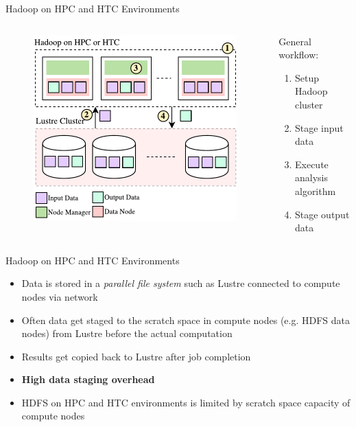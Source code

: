 \documentclass[newPxFont]{beamer}
\begin{document}
\begin{frame}[c]{Hadoop on HPC and HTC Environments}
\begin{columns}[T] %
\begin{column}{.48\textwidth}
\begin{figure}[t]
  \includegraphics[scale=0.5]{hadoop-on-hpc}
  \centering
\end{figure}
\end{column}%
\hfill%
\begin{column}{.48\textwidth}
General workflow:
\begin{enumerate}
  \item Setup Hadoop cluster
  \item Stage input data
  \item Execute analysis algorithm
  \item Stage output data
\end{enumerate}
\end{column}%
\end{columns}

\end{frame}

\begin{frame}[c]{Hadoop on HPC and HTC Environments}
  \begin{itemize}
    \item Data is stored in a \emph{parallel file system} such as Lustre connected to compute nodes via network
    \item Often data get staged to the scratch space in compute nodes (e.g. HDFS data nodes) from Lustre before the actual computation
    \item Results get copied back to Lustre after job completion
    \item \textbf{High data staging overhead}
    \item HDFS on HPC and HTC environments is limited by scratch space capacity of compute nodes
  \end{itemize}
\end{frame}
\end{document}
